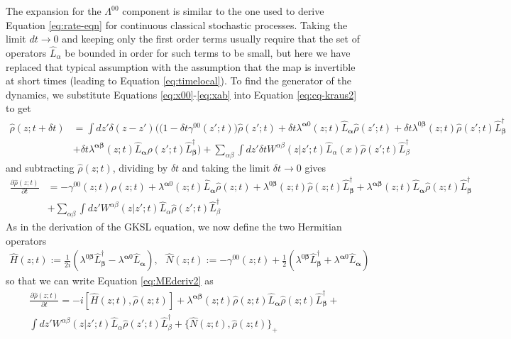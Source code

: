 \documentclass[aps,pra,showpacs,citeautoscript,amsmath,amssymb,floatfix,superscriptaddress,bbm, verbatim,amsfonts,changes,11pt,nofootinbib,longbibliography]{revtex4-2}
\newcommand{\ag}{{\boldsymbol\alpha}}
\newcommand{\bg}{{\boldsymbol\beta}}
\def\s{\,\,\,\,}
\def\X{\Lambda}
\def\z{{z}}
\def\NE{\hat{N}}
\def\L{{\hat{L}}}
\def\Hq{\hat{H}}
\def\dt{\delta t}
\def\rate{{W}}
\def\linrate{{\lambda}}
\def\psstay{{\gamma}}
\renewcommand{\varrho}{\hat{\rho}}
\def\psiz{{\varrho(\z;t)}}
\def\psizt{{\varrho(\z;t)}}
\begin{document}
The expansion for the $\X^{00}$ component is similar to the one used to derive Equation \eqref{eq:rate-eqn} for continuous classical stochastic processes. %
Taking the limit $dt\rightarrow 0$ and keeping only the first order terms usually require that the set of operators $\L_\alpha$ be bounded in order for such terms to be small, but here we have replaced that typical assumption with the assumption that the map is invertible at short times (leading to Equation \eqref{eq:timelocal}).
To find the generator of the dynamics, we substitute Equations \eqref{eq:x00}-\eqref{eq:xab} into Equation \eqref{eq:cq-kraus2} 
to get
\begin{align}
\varrho(\z;t+\dt)
& =  \int d\z'\delta(\z-\z')\Big(\big(1-\dt\psstay^{00}(\z';t)\big)\varrho(\z';t)
  +
 \dt\linrate^{\ag 0}(\z;t)
 \L_{\ag}\varrho(\z';t)
 +
  \dt\linrate^{0\bg}(\z;t)
\varrho(\z';t) \L_{\bg}^\dagger
\nonumber\\
&+
  \dt\linrate^{\ag\bg}(\z;t)
\L_{\ag}\varrho(\z';t) \L_{\bg}^\dagger
\Big)
 + \sum_{\alpha\beta}
 \int d\z' \dt\rate^{\alpha\beta}(\z|\z';t)
  \L_{\alpha}(x)\varrho(\z';t)\L_{\beta}^\dagger
\label{eq:MEderiv1} 
\end{align}
and subtracting $\psizt$, dividing by $\dt$ and taking the limit $\dt\rightarrow 0$ gives
\begin{align}
  \frac{\partial\psiz}{\partial t}
 & =  -\psstay^{00}(\z;t)\psizt
  +
\linrate^{\ag 0}(\z;t)
 \L_{\ag}\psizt
 +
\linrate^{0\bg}(\z;t)
\psizt \L_{\bg}^\dagger
+
\linrate^{\ag\bg}(\z;t)
\L_{\ag}\psizt \L_{\bg}^\dagger
\nonumber\\
& +
 \sum_{\alpha\beta}
 \int d\z' \rate^{\alpha\beta}(\z|\z';t)
  \L_{\alpha}\varrho(\z';t)\L_{\beta}^\dagger
\label{eq:MEderiv2}  
\end{align}
As in the derivation of the GKSL equation, we now define the two Hermitian operators
\begin{align}
\Hq(\z;t):=\frac{1}{2i}(
\linrate^{0\bg}\L^\dagger_{\bg}
-\linrate^{\ag 0}\L_{\ag}
)
,\s
\NE(\z;t):=
-\psstay^{00}(\z;t)
+
\frac{1}{2}(
\linrate^{0\bg}\L^\dagger_{\bg}
+\linrate^{\ag 0}\L_{\ag}
)
\end{align}
so that we can write Equation \eqref{eq:MEderiv2} as
\begin{multline}
 \frac{\partial\psiz}{\partial t}
 =
 -i[\Hq(\z;t),\psizt]
 +
 \linrate^{\ag\bg}(\z;t)\psizt
\L_{\ag}\psizt \L_{\bg}^\dagger
  + \\
 \int d\z' \rate^{\alpha\beta}(\z|\z';t)
  \L_{\alpha}\varrho(\z';t)\L_{\beta}^\dagger
  +\{\NE(\z;t),\psizt\}_+
\end{multline}
\end{document}
